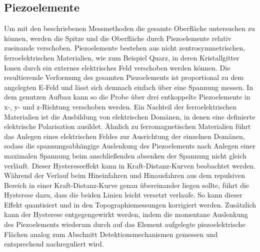       \subsection{Piezoelemente}
          Um mit den beschriebenen Messmethoden die gesamte Oberfläche untersuchen zu können, werden die Spitze und die Oberfläche durch Piezoelemente relativ zueinande verschoben. Piezoelemente bestehen aus 
          nicht zentrosymmetrischen, ferroelektrischen Materialien, wie zum Beispiel Quarz, in deren Kristallgitter Ionen durch ein externes elektrisches Feld verschoben werden können. Die resultierende 
          Verformung des gesamten Piezoelements ist proportional zu dem angelegten E-Feld und lässt sich demnach einfach über eine Spannung messen. In dem genutzen Aufbau kann so die Probe über drei 
          entkoppelte Piezoelemente in x-, y- und z-Richtung verschoben werden. Ein Nachteil der ferroelektrischen Materialien ist die Ausbildung von elektrischen Domänen, in denen eine definierte elektrische
          Polarisation ausildet. Ähnlich zu ferromagnetischen Materialien führt das Anlegen eines elektrischen Feldes zur Ausrichtung der einzelnen Domänen, sodass die spannungsabhängige Auslenkung des
          Piezoelements nach Anlegen einer maximalen Spannung beim anschließenden absenken der Spannung nicht gleich verläuft. Dieser Hystereseeffekt kann in Kraft-Distanz-Kurven beobachtet werden. 
          Während der Verlauf beim Hineinfahren und Hinausfahren aus dem repulsiven Bereich in einer Kraft-Distanz-Kurve genau übereinander liegen sollte, führt die 
          Hysterese dazu, dass die beiden Linien leicht versetzt verlaufe. So kann dieser Effekt quantisiert und in den Topographiemessungen korrigiert werden. Zusätzlich kann der Hysterese entgegengewirkt werden, 
          indem die momentane Auslenkung des Piezoelements wiederum durch auf das Element aufgelegte piezoelektrische Flächen analog zum Abschnitt Detektionsmechanismen gemessen und entsprechend nachreguliert wird. 



           

